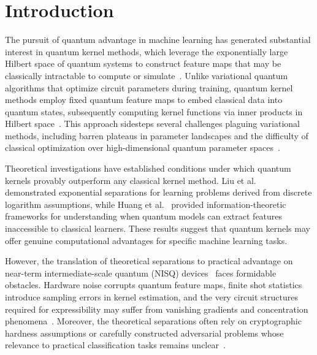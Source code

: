 \documentclass[aps,prb,reprint,superscriptaddress,showpacs]{revtex4-2}
\begin{document}
\maketitle

\section{Introduction}

The pursuit of quantum advantage in machine learning has generated substantial interest in quantum kernel methods, which leverage the exponentially large Hilbert space of quantum systems to construct feature maps that may be classically intractable to compute or simulate~\cite{Schuld2019QuantumML, Havlicek2019SupervisedLearning}. Unlike variational quantum algorithms that optimize circuit parameters during training, quantum kernel methods employ fixed quantum feature maps to embed classical data into quantum states, subsequently computing kernel functions via inner products in Hilbert space~\cite{Schuld2021QuantumKernel}. This approach sidesteps several challenges plaguing variational methods, including barren plateaus in parameter landscapes and the difficulty of classical optimization over high-dimensional quantum parameter spaces~\cite{McClean2018BarrenPlateaus}.

Theoretical investigations have established conditions under which quantum kernels provably outperform any classical kernel method. Liu et al.~\cite{Liu2021RigorousAdvantage} demonstrated exponential separations for learning problems derived from discrete logarithm assumptions, while Huang et al.~\cite{Huang2021PowerData} provided information-theoretic frameworks for understanding when quantum models can extract features inaccessible to classical learners. These results suggest that quantum kernels may offer genuine computational advantages for specific machine learning tasks.

However, the translation of theoretical separations to practical advantage on near-term intermediate-scale quantum (NISQ) devices~\cite{Preskill2018NISQ} faces formidable obstacles. Hardware noise corrupts quantum feature maps, finite shot statistics introduce sampling errors in kernel estimation, and the very circuit structures required for expressibility may suffer from vanishing gradients and concentration phenomena~\cite{Wang2021NoiseInduced, Thanasilp2024Exponential}. Moreover, the theoretical separations often rely on cryptographic hardness assumptions or carefully constructed adversarial problems whose relevance to practical classification tasks remains unclear~\cite{Kubler2021InductiveBias}.
\end{document}
